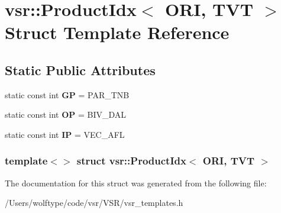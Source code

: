 \hypertarget{structvsr_1_1_product_idx_3_01_o_r_i_00_01_t_v_t_01_4}{\section{vsr\-:\-:Product\-Idx$<$ O\-R\-I, T\-V\-T $>$ Struct Template Reference}
\label{structvsr_1_1_product_idx_3_01_o_r_i_00_01_t_v_t_01_4}
}
\subsection*{Static Public Attributes}
\begin{DoxyCompactItemize}
\item 
\hypertarget{structvsr_1_1_product_idx_3_01_o_r_i_00_01_t_v_t_01_4_a50a0fb20a261bf7ed9392c36a5b93485}{static const int {\bfseries G\-P} = P\-A\-R\-\_\-\-T\-N\-B}\label{structvsr_1_1_product_idx_3_01_o_r_i_00_01_t_v_t_01_4_a50a0fb20a261bf7ed9392c36a5b93485}

\item 
\hypertarget{structvsr_1_1_product_idx_3_01_o_r_i_00_01_t_v_t_01_4_ae4aedd9423c10cf22abe9527894efd9c}{static const int {\bfseries O\-P} = B\-I\-V\-\_\-\-D\-A\-L}\label{structvsr_1_1_product_idx_3_01_o_r_i_00_01_t_v_t_01_4_ae4aedd9423c10cf22abe9527894efd9c}

\item 
\hypertarget{structvsr_1_1_product_idx_3_01_o_r_i_00_01_t_v_t_01_4_a148698ce61f174f2fcb228c339e769f8}{static const int {\bfseries I\-P} = V\-E\-C\-\_\-\-A\-F\-L}\label{structvsr_1_1_product_idx_3_01_o_r_i_00_01_t_v_t_01_4_a148698ce61f174f2fcb228c339e769f8}

\end{DoxyCompactItemize}
\subsubsection*{template$<$$>$ struct vsr\-::\-Product\-Idx$<$ O\-R\-I, T\-V\-T $>$}



The documentation for this struct was generated from the following file\-:\begin{DoxyCompactItemize}
\item 
/\-Users/wolftype/code/vsr/\-V\-S\-R/vsr\-\_\-templates.\-h\end{DoxyCompactItemize}
